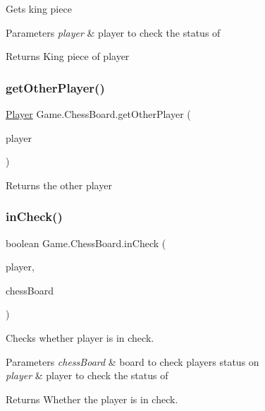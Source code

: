 Gets king piece 
\begin{DoxyParams}{Parameters}
{\em player} & player to check the status of \\
\hline
\end{DoxyParams}
\begin{DoxyReturn}{Returns}
King piece of player 
\end{DoxyReturn}
\mbox{\label{class_game_1_1_chess_board_a3d8adea17ddbb65aa9e527e711f80c51}} 
\subsubsection{\texorpdfstring{get\+Other\+Player()}{getOtherPlayer()}}
{\footnotesize\ttfamily \hyperlink{class_game_1_1_player}{Player} Game.\+Chess\+Board.\+get\+Other\+Player (\begin{DoxyParamCaption}\item[{\hyperlink{class_game_1_1_player}{Player}}]{player }\end{DoxyParamCaption})\hspace{0.3cm}{\ttfamily [inline]}}

Returns the other player \mbox{\label{class_game_1_1_chess_board_a7176cdb726816d1a5ce1aabd01c7f706}} 
\subsubsection{\texorpdfstring{in\+Check()}{inCheck()}}
{\footnotesize\ttfamily boolean Game.\+Chess\+Board.\+in\+Check (\begin{DoxyParamCaption}\item[{\hyperlink{class_game_1_1_player}{Player}}]{player,  }\item[{\hyperlink{class_game_1_1_chess_board}{Chess\+Board}}]{chess\+Board }\end{DoxyParamCaption})\hspace{0.3cm}{\ttfamily [inline]}}

Checks whether player is in check. 
\begin{DoxyParams}{Parameters}
{\em chess\+Board} & board to check players status on \\
\hline
{\em player} & player to check the status of \\
\hline
\end{DoxyParams}
\begin{DoxyReturn}{Returns}
Whether the player is in check. 
\end{DoxyReturn}
\mbox{\label{class_game_1_1_chess_board_a7a2ec0cc1f431ee502561c18a53a80cf}} 
